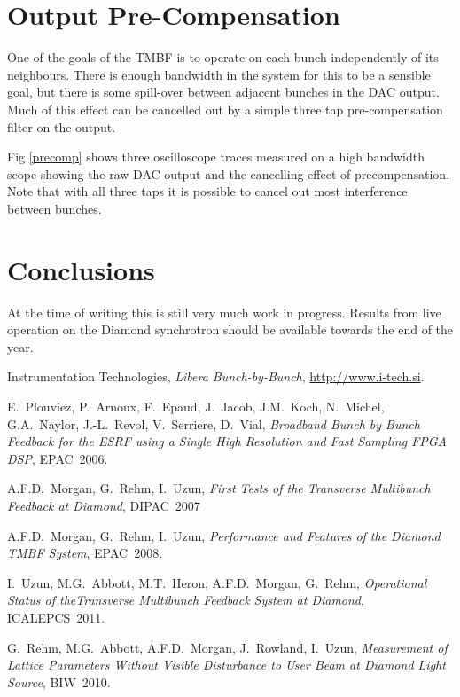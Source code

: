 \documentclass{JAC2003}
\begin{document}
\section{Output Pre-Compensation}

One of the goals of the TMBF is to operate on each bunch independently of its
neighbours.  There is enough bandwidth in the system for this to be a sensible
goal, but there is some spill-over between adjacent bunches in the DAC output.
Much of this effect can be cancelled out by a simple three tap pre-compensation
filter on the output.

Fig \ref{precomp} shows three oscilloscope traces measured on a high bandwidth
scope showing the raw DAC output and the cancelling effect of precompensation.
Note that with all three taps it is possible to cancel out most interference
between bunches.



\section{Conclusions}

At the time of writing this is still very much work in progress.  Results from
live operation on the Diamond synchrotron should be available towards the end of
the year.



\begin{thebibliography}{9}

Instrumentation Technologies, \emph{Libera Bunch-by-Bunch},
\url{http://www.i-tech.si}.

E.~Plouviez, P.~Arnoux, F.~Epaud, J.~Jacob, J.M.~Koch, N.~Michel, G.A.~Naylor,
J.\mbox{-}L.~Revol, V.~Serriere, D.~Vial, \emph{Broadband Bunch by Bunch
Feedback for the ESRF using a Single High Resolution and Fast Sampling FPGA
DSP}, EPAC~2006.

A.F.D.~Morgan, G.~Rehm, I.~Uzun, \emph{First Tests of the Transverse Multibunch
Feedback at Diamond}, DIPAC~2007

A.F.D.~Morgan, G.~Rehm, I.~Uzun, \emph{Performance and Features of the Diamond
TMBF System}, EPAC~2008.

I.~Uzun, M.G.~Abbott, M.T.~Heron, A.F.D.~Morgan, G.~Rehm, \emph{Operational
Status of theTransverse Multibunch Feedback System at Diamond}, ICALEPCS~2011.

G.~Rehm, M.G.~Abbott, A.F.D.~Morgan, J.~Rowland, I.~Uzun, \emph{Measurement of
Lattice Parameters Without Visible Disturbance to User Beam at Diamond Light
Source}, BIW~2010.


\end{thebibliography}
\end{document}
